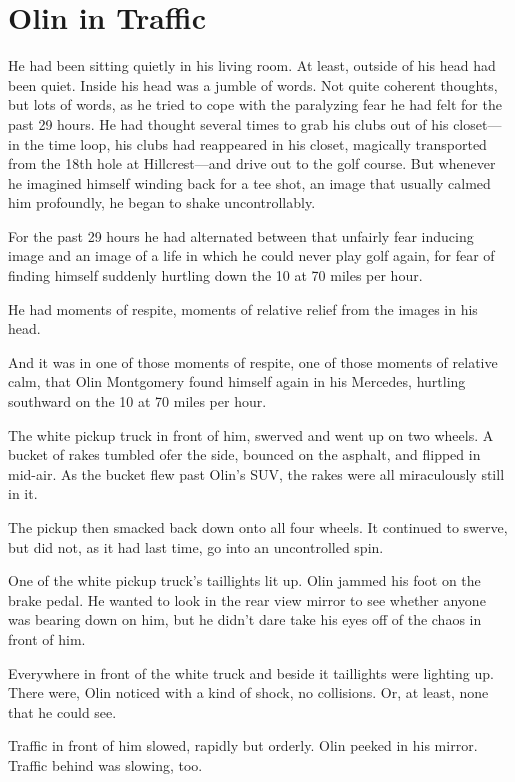 \chapter{Olin in Traffic}

 He had been sitting quietly in his living room. At least, outside of his head had been quiet. Inside his head was a jumble of words. Not quite coherent thoughts, but lots of words, as he tried to cope with the paralyzing fear he had felt for the past 29 hours. He had thought several times to grab his clubs out of his closet—in the time loop, his clubs had reappeared in his closet, magically transported from the 18th hole at Hillcrest—and drive out to the golf course. But whenever he imagined himself winding back for a tee shot, an image that usually calmed him profoundly, he began to shake uncontrollably.

For the past 29 hours he had alternated between that unfairly fear inducing image and an image of a life in which he could never play golf again, for fear of finding himself suddenly hurtling down the 10 at 70 miles per hour.

He had moments of respite, moments of relative relief from the images in his head.

And it was in one of those moments of respite, one of those moments of relative calm, that Olin Montgomery found himself again in his Mercedes, hurtling southward on the 10 at 70 miles per hour.

The white pickup truck in front of him, swerved and went up on two wheels. A bucket of rakes tumbled ofer the side, bounced on the asphalt, and flipped in mid-air. As the bucket flew past Olin’s SUV, the rakes were all miraculously still in it.

The pickup then smacked back down onto all four wheels. It continued to swerve, but did not, as it had last time, go into an uncontrolled spin.

One of the white pickup truck’s taillights lit up. Olin jammed his foot on the brake pedal. He wanted to look in the rear view mirror to see whether anyone was bearing down on him, but he didn’t dare take his eyes off of the chaos in front of him.

Everywhere in front of the white truck and beside it taillights were lighting up. There were, Olin noticed with a kind of shock, no collisions. Or, at least, none that he could see.

Traffic in front of him slowed, rapidly but orderly. Olin peeked in his mirror. Traffic behind was slowing, too.

